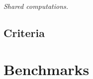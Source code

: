\begin{description}
\begin{itemize}
    \end{itemize}



\item \textit{Shared computations.}\hfill\\
    \todo{}



\end{description}

\subsection{Criteria}



\section{Benchmarks}
\label{sec:5:benchmarks}




